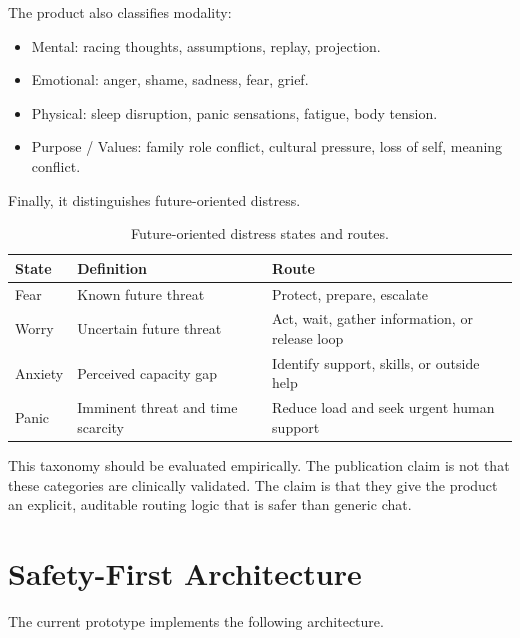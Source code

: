 \documentclass[11pt]{article}
\begin{document}
The product also classifies modality:

\begin{itemize}
  \item Mental: racing thoughts, assumptions, replay, projection.
  \item Emotional: anger, shame, sadness, fear, grief.
  \item Physical: sleep disruption, panic sensations, fatigue, body tension.
  \item Purpose / Values: family role conflict, cultural pressure, loss of self, meaning conflict.
\end{itemize}

Finally, it distinguishes future-oriented distress.

\begin{table}[htbp]
\centering
\caption{Future-oriented distress states and routes.}
\begin{tabularx}{\textwidth}{p{}YY}
\toprule
State & Definition & Route \\
\midrule
Fear & Known future threat & Protect, prepare, escalate \\
Worry & Uncertain future threat & Act, wait, gather information, or release loop \\
Anxiety & Perceived capacity gap & Identify support, skills, or outside help \\
Panic & Imminent threat and time scarcity & Reduce load and seek urgent human support \\
\bottomrule
\end{tabularx}
\end{table}

This taxonomy should be evaluated empirically. The publication claim is not that these categories are clinically validated. The claim is that they give the product an explicit, auditable routing logic that is safer than generic chat.

\section{Safety-First Architecture}

The current prototype implements the following architecture.
\end{document}
